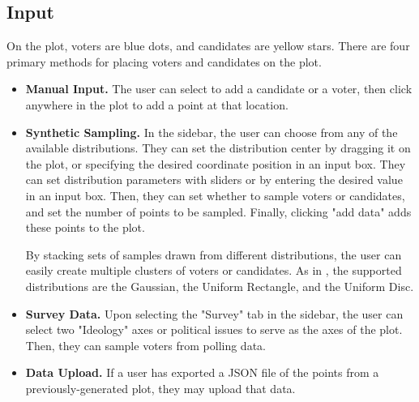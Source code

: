 \subsection{Input}%
\label{sub:Input}
On the plot, voters are blue dots, and candidates are yellow stars.
There are four primary methods for placing voters and candidates on the plot.
\begin{itemize}
  \item \textbf{Manual Input.}
    The user can select to add a candidate or a voter,
    then click anywhere in the plot to add a point at that location.

  \item \textbf{Synthetic Sampling.}
    In the sidebar, the user can choose from any of the available distributions.
    They can set the distribution center by dragging it on the plot,
    or specifying the desired coordinate position in an input box.
    They can set distribution parameters with sliders or by entering
    the desired value in an input box.
    Then, they can set whether to sample voters or candidates,
    and set the number of points to be sampled.
    Finally, clicking "add data" adds these points to the plot.

    By stacking sets of samples drawn from different distributions,
    the user can easily create multiple clusters of voters or candidates.
    As in \cite{elkind}, the supported distributions are
    the Gaussian, the Uniform Rectangle, and the Uniform Disc.

  \item \textbf{Survey Data.}
    Upon selecting the "Survey" tab in the sidebar,
    the user can select two "Ideology" axes or political issues
    to serve as the axes of the plot.
    Then, they can sample voters from polling data.

    \item \textbf{Data Upload.}
    If a user has exported a JSON file of the points from a previously-generated plot,
    they may upload that data.
\end{itemize}

